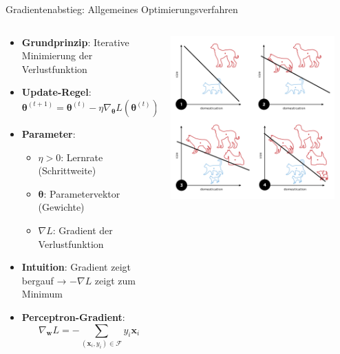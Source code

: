 \documentclass[aspectratio=1610, xcolor=dvipsnames, 9pt]{beamer}
\begin{document}
      \begin{frame}{Gradientenabstieg: Allgemeines Optimierungsverfahren}
        \begin{columns}
          \begin{column}{0.7\textwidth}
            \begin{itemize}
              \item \textbf{Grundprinzip}: Iterative Minimierung der Verlustfunktion
              \item \textbf{Update-Regel}:
              \begin{equation}
                \boldsymbol{\theta}^{(t+1)} = \boldsymbol{\theta}^{(t)} - \eta \nabla_{\boldsymbol{\theta}} L(\boldsymbol{\theta}^{(t)})
              \end{equation}
              \item \textbf{Parameter}:
              \begin{itemize}
                \item $\eta > 0$: Lernrate (Schrittweite)
                \item $\boldsymbol{\theta}$: Parametervektor (Gewichte)
                \item $\nabla L$: Gradient der Verlustfunktion
              \end{itemize}
              \item \textbf{Intuition}: Gradient zeigt bergauf → $-\nabla L$ zeigt zum Minimum
              \item \textbf{Perceptron-Gradient}:
              \begin{equation}
                \nabla_{\mathbf{w}} L = -\sum_{(\mathbf{x}_i, y_i) \in \mathcal{F}} y_i \mathbf{x}_i
              \end{equation}
            \end{itemize}
          \end{column}
          \begin{column}{0.3\textwidth}
            \centering
            \includegraphics[width=0.9\textwidth]{images/Perceptron_example.svg.png}

\end{column}
\end{columns}
\end{frame}
\end{document}
